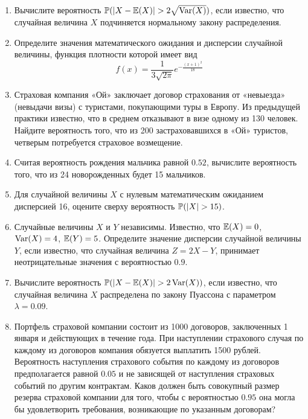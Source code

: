 \begin{enumerate}
\item Вычислите вероятность $\P(|X-\E(X)|>2\sqrt{\Var(X)})$, если известно, что
случайная величина $X$ подчиняется нормальному закону распределения.

\item Определите значения математического ожидания и дисперсии случайной
величины, функция плотности которой имеет вид
\[
f(x)=\frac{1}{3\sqrt{2\pi}}e^{-\frac{(x+1)^2}{18}}
\]

\item Страховая компания «Ой» заключает договор страхования от «невыезда» (невыдачи
визы) с туристами, покупающими туры в Европу. Из предыдущей практики известно,
что в среднем отказывают в визе одному из 130 человек. Найдите вероятность того,
что из 200 застраховавшихся в «Ой» туристов, четверым потребуется страховое возмещение.

\item Считая вероятность рождения мальчика равной $0.52$, вычислите вероятность того, что
из 24 новорожденных будет 15 мальчиков.

\item Для случайной величины $X$ с нулевым математическим ожиданием
дисперсией 16, оцените сверху вероятность $\P(|X| > 15)$.

\item Случайные величины $X$ и $Y$ независимы. Известно, что $\E(X)=0$, $\Var(X)=4$,
$\E(Y)=5$. Определите значение дисперсии случайной величины $Y$, если известно,
что случайная величина $Z=2X-Y$, принимает неотрицательные значения с вероятностью $0.9$.

\item Вычислите вероятность $\P(| X - \E(X)| > 2\Var(X))$, если известно, что
случайная величина $X$ распределена по закону Пуассона с параметром $\lambda = 0.09$.

\item Портфель страховой компании состоит из 1000 договоров, заключенных 1
января и действующих в течение года. При наступлении страхового случая по каждому из
договоров компания обязуется выплатить 1500 рублей. Вероятность наступления страхового
события по каждому из договоров предполагается равной $0.05$ и не зависящей от наступления
страховых событий по другим контрактам. Каков должен быть совокупный размер резерва
страховой компании для того, чтобы с вероятностью $0.95$ она могла бы удовлетворить
требования, возникающие по указанным договорам?


\end{enumerate}

